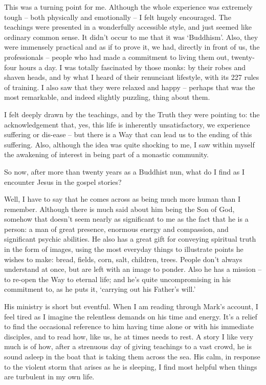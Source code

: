 This was a turning point for me. Although the whole experience was extremely tough -- both physically and emotionally -- I felt hugely encouraged. The teachings were presented in a wonderfully accessible style, and just seemed like ordinary common sense. It didn't occur to me that it was `Buddhism'. Also, they were immensely practical and as if to prove it, we had, directly in front of us, the professionals -- people who had made a commitment to living them out, twenty-four hours a day. I was totally fascinated by those monks: by their robes and shaven heads, and by what I heard of their renunciant lifestyle, with its 227 rules of training. I also saw that they were relaxed and happy -- perhaps that was the most remarkable, and indeed slightly puzzling, thing about them.

I felt deeply drawn by the teachings, and by the Truth they were pointing to: the acknowledgement that, yes, this life is inherently unsatisfactory, we experience suffering or dis-ease -- but there is a Way that can lead us to the ending of this suffering. Also, although the idea was quite shocking to me, I saw within myself the awakening of interest in being part of a monastic community. 

So now, after more than twenty years as a Buddhist nun, what do I find as I encounter Jesus in the gospel stories?

Well, I have to say that he comes across as being much more human than I remember. Although there is much said about him being the Son of God, somehow that doesn't seem nearly as significant to me as the fact that he is a person: a man of great presence, enormous energy and compassion, and significant psychic abilities. He also has a great gift for conveying spiritual truth in the form of images, using the most everyday things to illustrate points he wishes to make: bread, fields, corn, salt, children, trees. People don't always understand at once, but are left with an image to ponder. Also he has a mission -- to re-open the Way to eternal life; and he's quite uncompromising in his commitment to, as he puts it, `carrying out his Father's will.'

His ministry is short but eventful. When I am reading through Mark's account, I feel tired as I imagine the relentless demands on his time and energy. It's a relief to find the occasional reference to him having time alone or with his immediate disciples, and to read how, like us, he at times needs to rest. A story I like very much is of how, after a strenuous day of giving teachings to a vast crowd, he is sound asleep in the boat that is taking them across the sea. His calm, in response to the violent storm that arises as he is sleeping, I find most helpful when things are turbulent in my own life.

